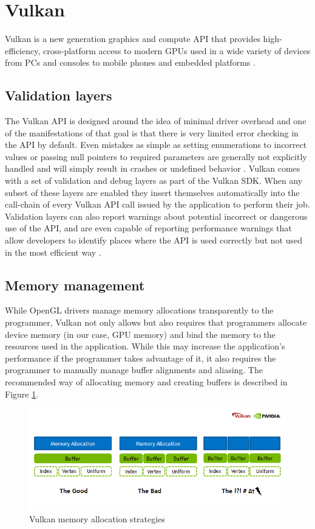\section{Vulkan}
Vulkan is a new generation graphics and compute API that provides high-efficiency, cross-platform access to modern GPUs used in a wide variety of devices from PCs and consoles to mobile phones and embedded platforms \cite{vulkan}.

\subsection{Validation layers}
The Vulkan API is designed around the idea of minimal driver overhead and one of the manifestations of that goal is that there is very limited error checking in the API by default. Even mistakes as simple as setting enumerations to incorrect values or passing null pointers to required parameters are generally not explicitly handled and will simply result in crashes or undefined behavior \cite{vulkan_tutorial}. Vulkan comes with a set of validation and debug layers as part of the Vulkan SDK. When any subset of these layers are enabled they insert themselves automatically into the call-chain of every Vulkan API call issued by the application to perform their job. Validation layers can also report warnings about potential incorrect or dangerous use of the API, and are even capable of reporting performance warnings that allow developers to identify places where the API is used correctly but not used in the most efficient way \cite{vulkan_validation_layers}.

\subsection{Memory management}
While OpenGL drivers manage memory allocations transparently to the programmer, Vulkan not only allows but also requires that programmers allocate device memory (in our case, GPU memory) and bind the memory to the resources used in the application. While this may increase the application's performance if the programmer takes advantage of it, it also requires the programmer to manually manage buffer alignments and aliasing.  The recommended way of allocating memory and creating buffers is described in Figure \ref{fig:vulkan_mem_alloc}.

\begin{figure}[ht]
    \centering
    \includegraphics[width = 15cm]{figs/vulkan_memory_strategy.png}
    \caption{Vulkan memory allocation strategies}
    \label{fig:vulkan_mem_alloc}
\end{figure}

